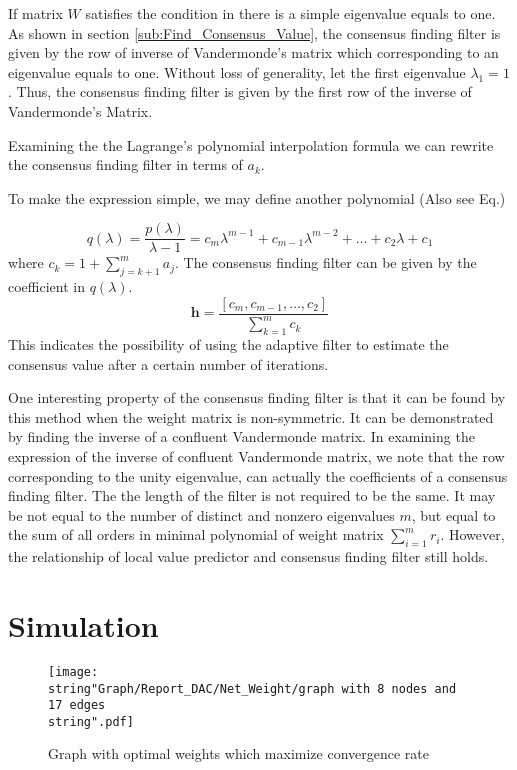 If matrix $W$ satisfies the condition in 
there is a simple eigenvalue equals to one. As shown in section \ref{sub:Find_Consensus_Value},
the consensus finding filter is given by the row of inverse of Vandermonde's
matrix which corresponding to an eigenvalue equals to one. Without
loss of generality, let the first eigenvalue $\lambda_{1}=1$. Thus,
the consensus finding filter is given by the first row of the inverse
of Vandermonde's Matrix.

Examining the the Lagrange's polynomial interpolation formula 
we can rewrite the consensus finding filter in terms of $a_{k}$. 

To make the expression simple, we may define another polynomial (Also
see Eq.)

\[
q\left(\lambda\right)=\frac{p\left(\lambda\right)}{\lambda-1}=c_{m}\lambda^{m-1}+c_{m-1}\lambda^{m-2}+\ldots+c_{2}\lambda+c_{1}
\]
where $c_{k}=1+\sum_{j=k+1}^{m}a_{j}$. The consensus finding filter
can be given by the coefficient in $q\left(\lambda\right)$. 
\begin{equation}
\mathbf{h}=\frac{\left[c_{m},c_{m-1},\ldots,c_{2}\right]}{\sum_{k=1}^{m}c_{k}}\label{eq:Consensus Filter by polynomial}
\end{equation}
This indicates the possibility of using the adaptive filter to estimate
the consensus value after a certain number of iterations. 

One interesting property of the consensus finding filter is that it
can be found by this method when the weight matrix is non-symmetric.
It can be demonstrated by finding the inverse of a confluent Vandermonde
matrix. In examining the expression of the inverse of confluent Vandermonde
matrix, we note that the row corresponding to the unity eigenvalue,
can actually the coefficients of a consensus finding filter. The the
length of the filter is not required to be the same. It may be not
equal to the number of distinct and nonzero eigenvalues $m$, but
equal to the sum of all orders in minimal polynomial of weight matrix
$\sum_{i=1}^{m}r_{i}$. However, the relationship of local value predictor
and consensus finding filter still holds. 


\section{Simulation\label{sub:Numerical-Simulation}}

\begin{figure}
\hfill{}\texttt{[image: \\string"Graph/Report\_DAC/Net\_Weight/graph with 8 nodes and 17 edges\\string".pdf]}\hfill{}\hfill{}\caption{\label{fig:Graph in Xiao'paper}Graph with optimal weights which maximize
convergence rate }
\end{figure}


